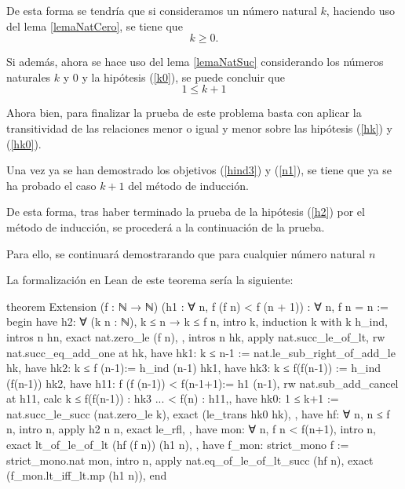 \begin{demostracion}
\begin{itemize}
\begin{enumerate}
        De esta forma se tendría que si consideramos un número
        natural \(k\), haciendo uso del lema \ref{lemaNatCero}, se
        tiene que
        \begin{equation}\label{k0}
          k≥0.
        \end{equation}

        Si además, ahora se hace uso del lema \ref{lemaNatSuc}
        considerando los números naturales \(k\) y \(0\) y la
        hipótesis (\ref{k0}), se puede concluir que
        \begin{equation}\label{hk0}\tag{hk0}
          1≤k+1
        \end{equation}

        Ahora bien, para finalizar la prueba de este problema basta
        con aplicar la transitividad de las relaciones menor o igual
        y menor sobre las hipótesis (\ref{hk}) y (\ref{hk0}).

      \end{enumerate}

    Una vez ya se han demostrado los objetivos (\ref{hind3}) y
    (\ref{n1}), se tiene que ya se ha probado el caso \(k+1\) del
    método de inducción.
    \end{itemize}

  De esta forma, tras haber terminado la prueba de la hipótesis
  (\ref{h2}) por el método de inducción, se procederá a la
  continuación de la prueba. 

  Para ello, se continuará demostrarando que para cualquier número
  natural \(n\)
\end{demostracion}

La formalización en Lean de este teorema sería la siguiente:
\begin{leancode}
theorem Extension
  (f : ℕ → ℕ)
  (h1 : ∀ n, f (f n) < f (n + 1))
  : ∀ n, f n = n :=
begin
  have h2: ∀ (k n : ℕ), k ≤ n → k ≤ f n,
  { intro k,
     induction k with k h_ind,
     { intros n hn,
       exact nat.zero_le (f n), },
     { intros n hk,
       apply nat.succ_le_of_lt,
       rw nat.succ_eq_add_one at hk,
       have hk1: k ≤ n-1 := nat.le_sub_right_of_add_le hk,
       have hk2: k ≤ f (n-1):= h_ind (n-1) hk1,
       have hk3: k ≤ f(f(n-1)) := h_ind (f(n-1)) hk2,
       have h11: f (f (n-1)) < f(n-1+1):= h1 (n-1),
       rw nat.sub_add_cancel at h11,
       { calc k ≤ f(f(n-1)) : hk3
            ... < f(n)      : h11,},
       have hk0: 1 ≤ k+1 := nat.succ_le_succ (nat.zero_le k),
       exact (le_trans hk0 hk), }},
  have hf: ∀ n, n ≤ f n,
    { intro n,
      apply h2 n n,
      exact le_rfl, },
  have mon: ∀ n, f n < f(n+1),
    { intro n,
      exact lt_of_le_of_lt (hf (f n)) (h1 n), },
  have f_mon: strict_mono f := strict_mono.nat mon,
  intro n,
  apply nat.eq_of_le_of_lt_succ (hf n),
  exact (f_mon.lt_iff_lt.mp (h1 n)),
end
\end{leancode}

